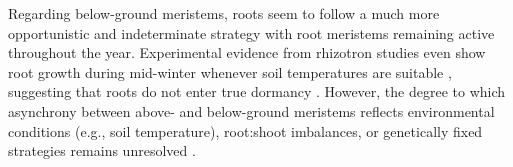 \documentclass{article}
\begin{document}
	Regarding below-ground meristems, roots seem to follow a much more opportunistic and indeterminate strategy with root meristems remaining active throughout the year. Experimental evidence from rhizotron studies even show root growth during mid-winter whenever soil temperatures are suitable \citep{lyfordControlledGrowthForest1966}, suggesting that roots do not enter true dormancy \citep{radvilleRootPhenologyChanging2016, marchandNoWinterHalt2025}. However, the degree to which asynchrony between above- and below-ground meristems reflects environmental conditions (e.g., soil temperature), root:shoot imbalances, or genetically fixed strategies remains unresolved \citep{abramoffAreBelowgroundPhenology2015, makotoSynchronousAsynchronousRoot2020, silvestroRootsLeavesTree2025, campioliEnvironmentalSensitivityImpact2024}.\\
	
	
	
	
\end{document}
